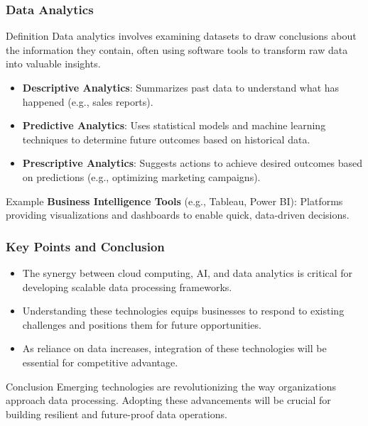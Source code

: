 \documentclass{beamer}
\begin{document}
\begin{frame}[fragile]
    \frametitle{Data Analytics}
    \begin{block}{Definition}
        Data analytics involves examining datasets to draw conclusions about the information they contain, often using software tools to transform raw data into valuable insights.
    \end{block}
    
    \begin{itemize}
        \item \textbf{Descriptive Analytics}: Summarizes past data to understand what has happened (e.g., sales reports).
        \item \textbf{Predictive Analytics}: Uses statistical models and machine learning techniques to determine future outcomes based on historical data.
        \item \textbf{Prescriptive Analytics}: Suggests actions to achieve desired outcomes based on predictions (e.g., optimizing marketing campaigns).
    \end{itemize}
    
    \begin{block}{Example}
        \textbf{Business Intelligence Tools} (e.g., Tableau, Power BI): Platforms providing visualizations and dashboards to enable quick, data-driven decisions.
    \end{block}
\end{frame}

\begin{frame}[fragile]
    \frametitle{Key Points and Conclusion}
    \begin{itemize}
        \item The synergy between cloud computing, AI, and data analytics is critical for developing scalable data processing frameworks.
        \item Understanding these technologies equips businesses to respond to existing challenges and positions them for future opportunities.
        \item As reliance on data increases, integration of these technologies will be essential for competitive advantage.
    \end{itemize}

    \begin{block}{Conclusion}
        Emerging technologies are revolutionizing the way organizations approach data processing. Adopting these advancements will be crucial for building resilient and future-proof data operations.
    \end{block}
\end{frame}
\end{document}
